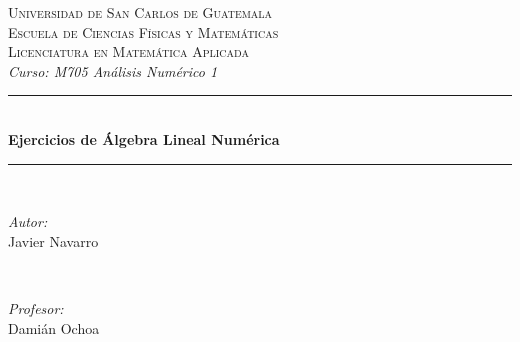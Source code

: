\documentclass[12pt]{book}
\begin{document}
\begin{titlepage}

\newcommand{\HRule}{\rule{\linewidth}{0.5mm}} 

\center 

\textsc{\Large Universidad de San Carlos de Guatemala}\\[0.2cm] %
\textsc{\large Escuela de Ciencias Físicas y Matemáticas}\\[0.2cm] %
\textsc{\large Licenciatura en Matemática Aplicada}\\[0.2cm] %
\emph{\large Curso: M705 Análisis Numérico 1}\\[1.2cm] %


\HRule \\[0.4cm]
{ \huge \bfseries Ejercicios de Álgebra Lineal Numérica}\\[0.4cm] %
\HRule \\[1.5cm]
 

\begin{minipage}{0.4\textwidth}
\begin{flushleft} \large
\emph{Autor:}\\
Javier  Navarro \\
\end{flushleft}
\end{minipage}
~
\begin{minipage}{0.4\textwidth}
\begin{flushright} \large
\emph{Profesor:} \\
Damián  Ochoa 
\end{flushright}
\end{minipage}\\[2cm]




\end{titlepage}
\end{document}

